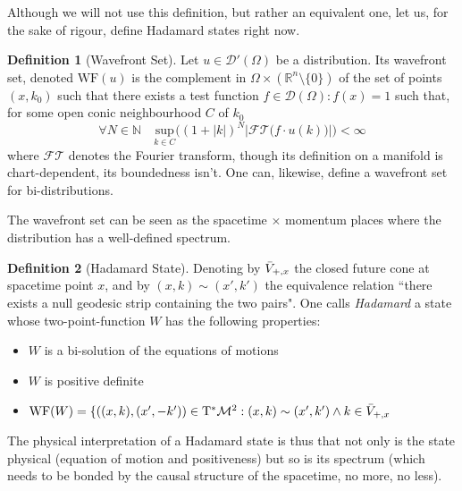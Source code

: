 \documentclass[a4paper,11pt]{article}
\numberwithin{equation}{section}
\theoremstyle{definition}
\newtheorem{definition}{Definition}
\begin{document}
Although we will not use this definition, but rather an equivalent one, let us, for the sake of rigour, define Hadamard states right now.
\begin{definition}[Wavefront Set]
    Let $u \in \mathcal{D}'(\Omega)$ be a distribution. Its wavefront set, denoted $\mathrm{WF}(u)$ is the complement in $\Omega\times(\mathbb{R}^n\setminus\{0\})$ of the set of points $(x,k_0)$ such that there exists a test function $f \in \mathcal{D}(\Omega): f(x)=1$  such that, for some open conic neighbourhood $C$ of $k_0$
    \begin{equation}
    \forall N \in \mathbb{N} \quad \underset{k\in C}{\mathrm{sup}} \Big((1+|k|)^N \left|\mathcal{FT} \big(f\cdot u(k)\big)\right|\Big) <\infty
    \end{equation}
    where $\mathcal{FT}$ denotes the Fourier transform, though its definition on a manifold is chart-dependent, its boundedness isn't.
    One can, likewise, define a wavefront set for bi-distributions.
\end{definition}
The wavefront set can be seen as the spacetime $\times$ momentum places where the distribution has a well-defined spectrum.
\begin{definition}[Hadamard State]\label{HadDef}
    Denoting by $\Bar{V}_{+,x}$ the closed future cone at spacetime point $x$, and by $(x,k)\sim(x',k')$ the equivalence relation ``there exists a null geodesic strip containing the two pairs". One calls \emph{Hadamard} a state whose two-point-function $W$ has the following properties:
    \begin{itemize}
        \item $W$ is a bi-solution of the equations of motions
        \item $W$ is positive definite
        \item $\mathrm{WF}(W)=\{ ((x,k),(x',-k'))\in \mathrm{T}^*\mathcal{M}^2 : (x,k)\sim(x',k')\wedge k \in \Bar{V}_{+,x}$
    \end{itemize}
\end{definition}
The physical interpretation of a Hadamard state is thus that not only is the state physical (equation of motion and positiveness) but so is its spectrum (which needs to be bonded by the causal structure of the spacetime, no more, no less).
\end{document}
